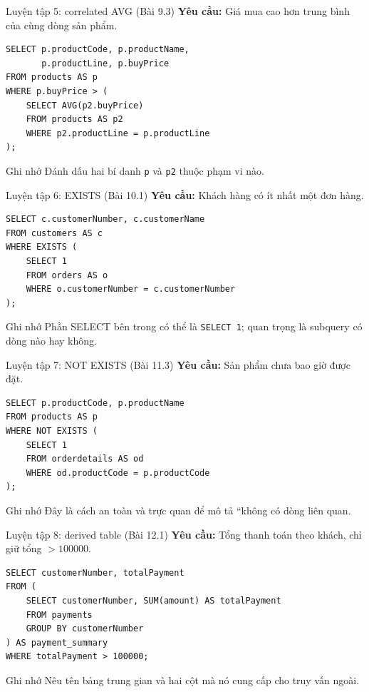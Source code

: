 \documentclass[aspectratio=169,10pt]{beamer}
\newcommand{\code}[1]{\texttt{#1}}
\begin{document}
\begin{frame}[fragile]{Luyện tập 5: correlated AVG (Bài 9.3)}
\textbf{Yêu cầu:} Giá mua cao hơn trung bình của cùng dòng sản phẩm.\vspace{.2em}\begin{lstlisting}
SELECT p.productCode, p.productName,
       p.productLine, p.buyPrice
FROM products AS p
WHERE p.buyPrice > (
    SELECT AVG(p2.buyPrice)
    FROM products AS p2
    WHERE p2.productLine = p.productLine
);
\end{lstlisting}
\begin{block}{Ghi nhớ}
\small Đánh dấu hai bí danh \code{p} và \code{p2} thuộc phạm vi nào.
\end{block}
\end{frame}

\begin{frame}[fragile]{Luyện tập 6: EXISTS (Bài 10.1)}
\textbf{Yêu cầu:} Khách hàng có ít nhất một đơn hàng.\vspace{.2em}\begin{lstlisting}
SELECT c.customerNumber, c.customerName
FROM customers AS c
WHERE EXISTS (
    SELECT 1
    FROM orders AS o
    WHERE o.customerNumber = c.customerNumber
);
\end{lstlisting}
\begin{block}{Ghi nhớ}
\small Phần SELECT bên trong có thể là \code{SELECT 1}; quan trọng là subquery có dòng nào hay không.
\end{block}
\end{frame}

\begin{frame}[fragile]{Luyện tập 7: NOT EXISTS (Bài 11.3)}
\textbf{Yêu cầu:} Sản phẩm chưa bao giờ được đặt.\vspace{.2em}\begin{lstlisting}
SELECT p.productCode, p.productName
FROM products AS p
WHERE NOT EXISTS (
    SELECT 1
    FROM orderdetails AS od
    WHERE od.productCode = p.productCode
);
\end{lstlisting}
\begin{block}{Ghi nhớ}
\small Đây là cách an toàn và trực quan để mô tả ``không có dòng liên quan.
\end{block}
\end{frame}

\begin{frame}[fragile]{Luyện tập 8: derived table (Bài 12.1)}
\textbf{Yêu cầu:} Tổng thanh toán theo khách, chỉ giữ tổng $>100000$.\vspace{.2em}\begin{lstlisting}
SELECT customerNumber, totalPayment
FROM (
    SELECT customerNumber, SUM(amount) AS totalPayment
    FROM payments
    GROUP BY customerNumber
) AS payment_summary
WHERE totalPayment > 100000;
\end{lstlisting}
\begin{block}{Ghi nhớ}
\small Nêu tên bảng trung gian và hai cột mà nó cung cấp cho truy vấn ngoài.
\end{block}
\end{frame}
\end{document}
